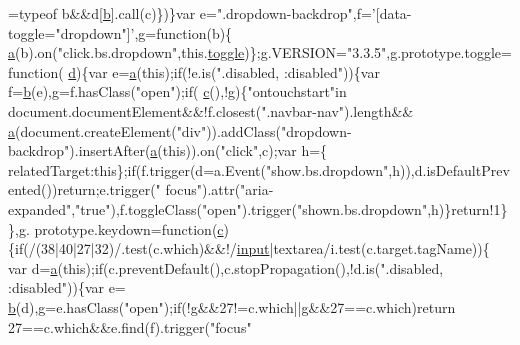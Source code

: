\begin{DoxyCode}
      =typeof b&&d[\hyperlink{a00029_ac0431efac4d7c393d1e70b86115cb93f}{b}].call(c)\})\}var e=\textcolor{stringliteral}{".dropdown-backdrop"},f=\textcolor{stringliteral}{'[data-toggle="dropdown"]'},g=\textcolor{keyword}{function}(b)\{
      \hyperlink{a00029_ae8f6b400ed3390908c5cdeebed3a82b9}{a}(b).on(\textcolor{stringliteral}{"click.bs.dropdown"},this.\hyperlink{a00029_aa8e797a9bda5e7e313be3518054164a3}{toggle})\};g.VERSION=\textcolor{stringliteral}{"3.3.5"},g.prototype.toggle=\textcolor{keyword}{function}(
      \hyperlink{a00029_aeb337d295abaddb5ec3cb34cc2e2bbc9}{d})\{var e=\hyperlink{a00029_ae8f6b400ed3390908c5cdeebed3a82b9}{a}(\textcolor{keyword}{this});\textcolor{keywordflow}{if}(!e.is(\textcolor{stringliteral}{".disabled, :disabled"}))\{var f=\hyperlink{a00029_ac0431efac4d7c393d1e70b86115cb93f}{b}(e),g=f.hasClass(\textcolor{stringliteral}{"open"});\textcolor{keywordflow}{if}(
      \hyperlink{a00029_ad9d1ac02e33c4aed62ad517a7cb8b3fb}{c}(),!g)\{\textcolor{stringliteral}{"ontouchstart"}in document.documentElement&&!f.closest(\textcolor{stringliteral}{".navbar-nav"}).length&&
      \hyperlink{a00029_ae8f6b400ed3390908c5cdeebed3a82b9}{a}(document.createElement(\textcolor{stringliteral}{"div"})).addClass(\textcolor{stringliteral}{"dropdown-backdrop"}).insertAfter(\hyperlink{a00029_ae8f6b400ed3390908c5cdeebed3a82b9}{a}(\textcolor{keyword}{this})).on(\textcolor{stringliteral}{"click"},c);var h=\{
      relatedTarget:\textcolor{keyword}{this}\};\textcolor{keywordflow}{if}(f.trigger(d=a.Event(\textcolor{stringliteral}{"show.bs.dropdown"},h)),d.isDefaultPrevented())\textcolor{keywordflow}{return};e.trigger(\textcolor{stringliteral}{"
      focus"}).attr(\textcolor{stringliteral}{"aria-expanded"},\textcolor{stringliteral}{"true"}),f.toggleClass(\textcolor{stringliteral}{"open"}).trigger(\textcolor{stringliteral}{"shown.bs.dropdown"},h)\}\textcolor{keywordflow}{return}!1\}\},g.
      prototype.keydown=\textcolor{keyword}{function}(\hyperlink{a00029_ad9d1ac02e33c4aed62ad517a7cb8b3fb}{c})\{\textcolor{keywordflow}{if}(/(38|40|27|32)/.test(c.which)&&!/\hyperlink{a00038}{input}|textarea/i.test(c.target.tagName))\{
      var d=\hyperlink{a00029_ae8f6b400ed3390908c5cdeebed3a82b9}{a}(\textcolor{keyword}{this});\textcolor{keywordflow}{if}(c.preventDefault(),c.stopPropagation(),!d.is(\textcolor{stringliteral}{".disabled, :disabled"}))\{var e=
      \hyperlink{a00029_ac0431efac4d7c393d1e70b86115cb93f}{b}(d),g=e.hasClass(\textcolor{stringliteral}{"open"});\textcolor{keywordflow}{if}(!g&&27!=c.which||g&&27==c.which)\textcolor{keywordflow}{return} 27==c.which&&e.find(f).trigger(\textcolor{stringliteral}{"focus"}

\end{DoxyCode}
